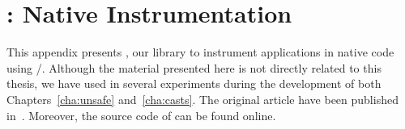 \chapter{\jnif{}: \java{} Native Instrumentation}
\label{ap:jnif}

This appendix presents \jnif{}, our library to instrument \java{} applications in native code using \cc{}/\cpp{}.
Although the material presented here is not directly related to this thesis, we have used \jnif{} in several experiments during the development of both Chapters~\ref{cha:unsafe} and~\ref{cha:casts}.
The original article have been published in~\cite{mastrangeloJNIFJavaNative2014}.
Moreover, the source code of \jnif{} can be found online.%









